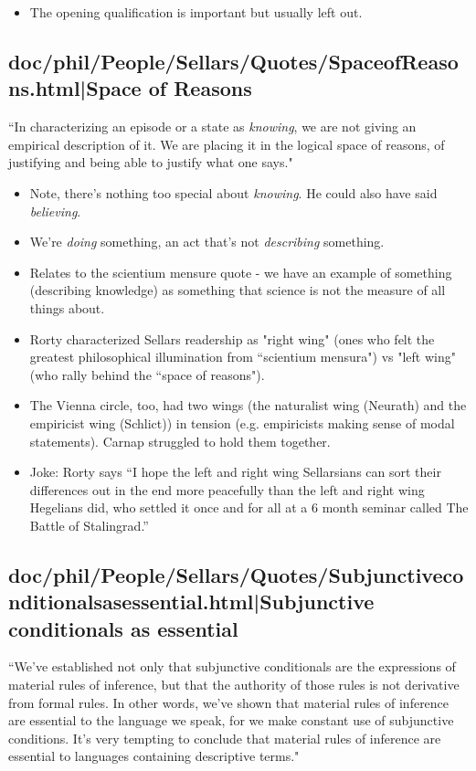 \documentclass[12pt,a4paper]{report}
\begin{document}
\cite{sellars1956empiricism}

\begin{itemize}
    \item The opening qualification is important but usually left out.
\end{itemize}

\subsection{doc/phil/People/Sellars/Quotes/SpaceofReasons.html|Space of Reasons}
``In characterizing an episode or a state as \emph{knowing}, we are not giving an empirical description of it. We are placing it in the logical space of reasons, of justifying and being able to justify what one says." \cite{sellars1956empiricism}
    \begin{itemize}
        \item Note, there's nothing too special about \emph{knowing}. He could also have said \emph{believing}.
        \item  We're \emph{doing} something, an act that's not \emph{describing} something.
        \item Relates to the scientium mensure quote - we have an example of something (describing knowledge) as something that science is not the measure of all things about.
        \item Rorty characterized Sellars readership as "right wing" (ones who felt the greatest philosophical illumination from ``scientium mensura") vs "left wing" (who rally behind the ``space of reasons").
        \item The Vienna circle, too, had two wings (the naturalist wing (Neurath) and the empiricist wing (Schlict)) in tension (e.g. empiricists making sense of modal statements). Carnap struggled to hold them together.
        \item Joke: Rorty says ``I hope the left and right wing Sellarsians can sort their differences out in the end more peacefully than the left and right wing Hegelians did, who settled it once and for all at a 6 month seminar called The Battle of Stalingrad.''
    \end{itemize}
\subsection{doc/phil/People/Sellars/Quotes/Subjunctiveconditionalsasessential.html|Subjunctive conditionals as essential}
``We've established not only that subjunctive conditionals are the expressions of material rules of inference, but that the authority of those rules is not derivative from formal rules. In other words, we've shown that material rules of inference are essential to the language we speak, for we make constant use of subjunctive conditions. It's very tempting to conclude that material rules of inference are essential to languages containing descriptive terms."
\end{document}
